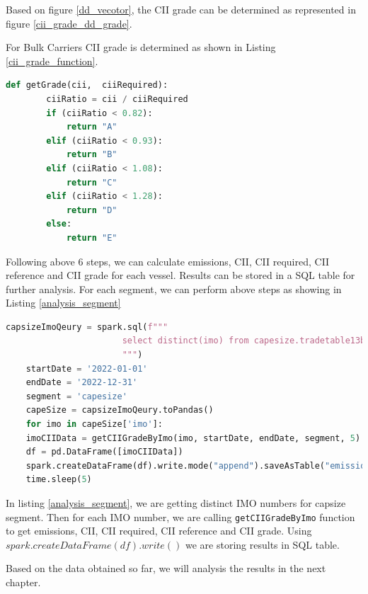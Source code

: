 Based on figure \ref{dd_vecotor}, the CII grade can be determined as represented in figure \ref{cii_grade_dd_grade}.

For Bulk Carriers CII grade is determined as shown in Listing \ref{cii_grade_function}.

\begin{lstlisting}[language=python, caption=Function to determine CII grading for Bulk Carriers, label=cii_grade_function]
    def getGrade(cii,  ciiRequired):
        ciiRatio = cii / ciiRequired
        if (ciiRatio < 0.82): 
            return "A"
        elif (ciiRatio < 0.93):
            return "B"
        elif (ciiRatio < 1.08):
            return "C"
        elif (ciiRatio < 1.28):
            return "D"
        else:
            return "E"
\end{lstlisting}

Following above 6 steps, we can calculate emissions, CII, CII required, CII reference and CII grade for each vessel.
Results can be stored in a SQL table for further analysis.
For each segment, we can perform above steps as showing in Listing \ref{analysis_segment}

\begin{lstlisting}[language=python, caption=Analysis for capsize segment, label=analysis_segment]
    capsizeImoQeury = spark.sql(f"""
                       select distinct(imo) from capesize.tradetable13bx as st
                       """)
    startDate = '2022-01-01'
    endDate = '2022-12-31'
    segment = 'capesize'
    capeSize = capsizeImoQeury.toPandas()
    for imo in capeSize['imo']:
    imoCIIData = getCIIGradeByImo(imo, startDate, endDate, segment, 5)
    df = pd.DataFrame([imoCIIData])
    spark.createDataFrame(df).write.mode("append").saveAsTable("emissions.capesize_cii_2022_v3")
    time.sleep(5)
\end{lstlisting}

In listing \ref{analysis_segment}, we are getting distinct IMO numbers for capsize segment.
Then for each IMO number, we are calling \texttt{getCIIGradeByImo} function to get emissions, CII, CII required, CII reference and CII grade.
Using $spark.createDataFrame(df).write()$ we are storing results in SQL table.

Based on the data obtained so far, we will analysis the results in the next chapter.